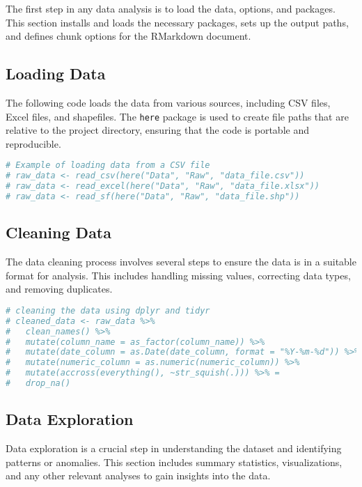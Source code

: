 \documentclass[
  12pt,
]{article}
\newcommand{\passthrough}[1]{#1}
\begin{document}
The first step in any data analysis is to load the data, options, and
packages. This section installs and loads the necessary packages, sets
up the output paths, and defines chunk options for the RMarkdown
document.

\subsection{Loading Data}\label{loading-data}

The following code loads the data from various sources, including CSV
files, Excel files, and shapefiles. The \passthrough{\lstinline!here!}
package is used to create file paths that are relative to the project
directory, ensuring that the code is portable and reproducible.

\begin{lstlisting}[language=R]
# Example of loading data from a CSV file
# raw_data <- read_csv(here("Data", "Raw", "data_file.csv"))
# raw_data <- read_excel(here("Data", "Raw", "data_file.xlsx"))
# raw_data <- read_sf(here("Data", "Raw", "data_file.shp"))
\end{lstlisting}

\subsection{Cleaning Data}\label{cleaning-data}

The data cleaning process involves several steps to ensure the data is
in a suitable format for analysis. This includes handling missing
values, correcting data types, and removing duplicates.

\begin{lstlisting}[language=R]
# cleaning the data using dplyr and tidyr
# cleaned_data <- raw_data %>%
#   clean_names() %>%
#   mutate(column_name = as_factor(column_name)) %>% 
#   mutate(date_column = as.Date(date_column, format = "%Y-%m-%d")) %>% 
#   mutate(numeric_column = as.numeric(numeric_column)) %>% 
#   mutate(accross(everything(), ~str_squish(.))) %>% =
#   drop_na()
\end{lstlisting}

\subsection{Data Exploration}\label{data-exploration}

Data exploration is a crucial step in understanding the dataset and
identifying patterns or anomalies. This section includes summary
statistics, visualizations, and any other relevant analyses to gain
insights into the data.
\end{document}
